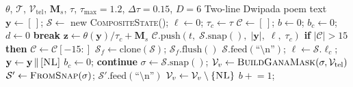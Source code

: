 \begin{algorithm}[H]
\caption{Strategy~2: Logit Masking with Backtracking}
\label{alg:masking-backtrack}
\scriptsize
\begin{algorithmic}[1]
\Require $\theta$, $\mathcal{T}$, $\mathcal{V}_{\text{tel}}$,
         $\mathbf{M}_s$, $\tau$,
         $\tau_{\max}{=}1.2$,
         $\Delta\tau{=}0.15$, $D{=}6$
\Ensure Two-line Dwipada poem text
\State $\mathbf{y} \gets [\,]$;\;
       $\mathcal{S} \gets$ new \textsc{CompositeState}();\;
       $\ell \gets 0$;\; $\tau_c \gets \tau$
\State $\mathcal{C} \gets [\,]$;\;
       $b \gets 0$;\; $b_c \gets 0$;\; $d \gets 0$
     \textbf{break} \EndIf
    \State $\mathbf{z} \gets \theta(\mathbf{y})/\tau_c
           + \mathbf{M}_s$
    \State {}
        \State $\mathcal{C}.\text{push}(t,\;
               \mathcal{S}.\text{snap}(),\;
               |\mathbf{y}|,\; \ell,\; \tau_c)$
        \State \textbf{if} $|\mathcal{C}| > 15$
               \textbf{then}
               $\mathcal{C} \gets \mathcal{C}[-15:]$
    \EndIf
    \State {}
    \State $\mathcal{S}_f \gets \text{clone}(\mathcal{S})$;\;
           $\mathcal{S}_f.\text{flush}()$
        \State $\mathcal{S}.\text{feed}(
               \text{``\textbackslash n''})$;\;
               $\ell \gets \mathcal{S}.\ell_c$;\;
               $\mathbf{y} \gets \mathbf{y} \,\|\,
               [\textsc{NL}]$
        \State $b_c \gets 0$;\; \textbf{continue}
    \EndIf
    \State {}
    \State $\sigma \gets \mathcal{S}.\text{snap}()$;\;
           $\mathcal{V}_v \gets
           \textsc{BuildGanaMask}(\sigma,
           \mathcal{V}_{\text{tel}})$
    \State {}
        \State $\mathcal{S}' \gets
               \textsc{FromSnap}(\sigma)$;\;
               $\mathcal{S}'.\text{feed}(
               \text{``\textbackslash n''})$
            \State $\mathcal{V}_v \gets
                   \mathcal{V}_v \setminus
                   \{\textsc{NL}\}$
        \EndIf
    \EndIf
    \State {}
        \State $b \mathrel{+}= 1$;\;

\end{algorithmic}
\end{algorithm}
